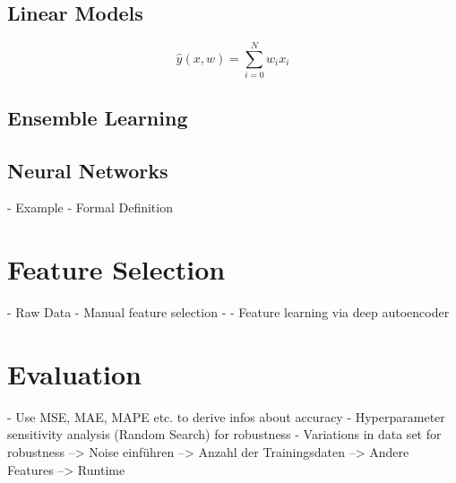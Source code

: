 \subsection{Linear Models}

\begin{equation*}
	\hat y(x,w) = \sum_{i=0}^N w_ix_i
\end{equation*}
\subsection{Ensemble Learning}

\subsection{Neural Networks}
- Example
- Formal Definition

\section{Feature Selection}

- Raw Data 
- Manual feature selection
- 
- Feature learning via deep autoencoder

\section{Evaluation} 
- Use MSE, MAE, MAPE etc. to derive infos about accuracy
- Hyperparameter sensitivity analysis (Random Search) for robustness
- Variations in data set for robustness
--> Noise einführen 
--> Anzahl der Trainingsdaten
--> Andere Features
--> Runtime